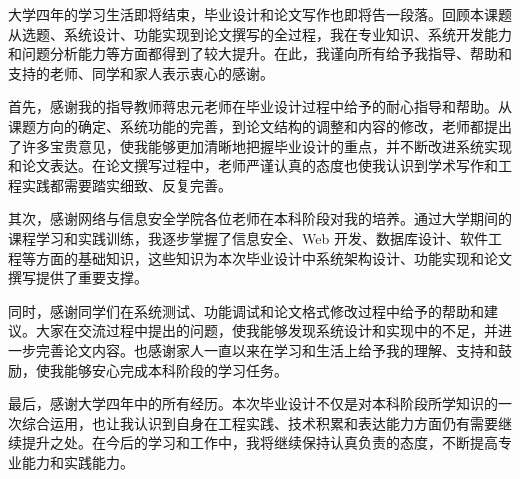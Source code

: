 大学四年的学习生活即将结束，毕业设计和论文写作也即将告一段落。回顾本课题从选题、系统设计、功能实现到论文撰写的全过程，我在专业知识、系统开发能力和问题分析能力等方面都得到了较大提升。在此，我谨向所有给予我指导、帮助和支持的老师、同学和家人表示衷心的感谢。

首先，感谢我的指导教师蒋忠元老师在毕业设计过程中给予的耐心指导和帮助。从课题方向的确定、系统功能的完善，到论文结构的调整和内容的修改，老师都提出了许多宝贵意见，使我能够更加清晰地把握毕业设计的重点，并不断改进系统实现和论文表达。在论文撰写过程中，老师严谨认真的态度也使我认识到学术写作和工程实践都需要踏实细致、反复完善。

其次，感谢网络与信息安全学院各位老师在本科阶段对我的培养。通过大学期间的课程学习和实践训练，我逐步掌握了信息安全、Web 开发、数据库设计、软件工程等方面的基础知识，这些知识为本次毕业设计中系统架构设计、功能实现和论文撰写提供了重要支撑。

同时，感谢同学们在系统测试、功能调试和论文格式修改过程中给予的帮助和建议。大家在交流过程中提出的问题，使我能够发现系统设计和实现中的不足，并进一步完善论文内容。也感谢家人一直以来在学习和生活上给予我的理解、支持和鼓励，使我能够安心完成本科阶段的学习任务。

最后，感谢大学四年中的所有经历。本次毕业设计不仅是对本科阶段所学知识的一次综合运用，也让我认识到自身在工程实践、技术积累和表达能力方面仍有需要继续提升之处。在今后的学习和工作中，我将继续保持认真负责的态度，不断提高专业能力和实践能力。